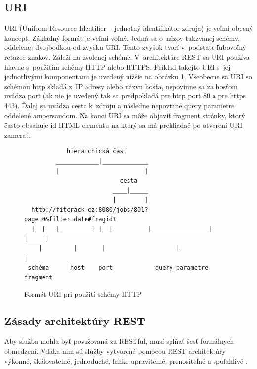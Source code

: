 \documentclass[slovak]{fitthesis}
\begin{document}
\subsection{URI} \label{URI}
URI (Uniform Resource Identifier – jednotný identifikátor zdroja) je veľmi obecný koncept. Základný formát je veľmi voľný. Jedná sa o~názov takzvanej schémy, oddelenej dvojbodkou od zvyšku URI. Tento zvyšok tvorí v~podstate ľubovoľný reťazec znakov. Záleží na zvolenej schéme\cite{URIRFC}. V~architektúre REST sa URI používa hlavne s~použitím schémy HTTP alebo HTTPS. Príklad takejto URI s~jej jednotlivými komponentami je uvedený nižšie na obrázku \ref{fig:formatURI}. Všeobecne sa URI so schémou http skladá z~IP adresy alebo názvu hosťa, nepovinne sa za hosťom uvádza port (ak nie je uvedený tak sa predpokladá pre http port 80 a pre https 443). Ďalej sa uvádza cesta k~zdroju a následne nepovinné query parametre oddelené ampersandom. Na konci URI sa môže objaviť fragment stránky, ktorý často obsahuje id HTML elementu na ktorý sa má prehliadač po otvorení URI zamerať.



\begin{figure}[H]
\begin{center}
\begin{varwidth}{\linewidth}
\begin{verbatim}
            hierarchická časť
         ____________|_____________                  
         |                        |
                           cesta
                         ____|_____
                         |        |
  http://fitcrack.cz:8080/jobs/801?page=0&filter=date#fragid1
  |__|   |_________| |__|          |________________| |_____|
    |         |       |                    |               |
 schéma      host    port            query parametre    fragment

\end{verbatim}
\end{varwidth}
\end{center}
\caption{Formát URI pri použití schémy HTTP}
\label{fig:formatURI}
\end{figure}



\subsection{Zásady architektúry REST} \label{zasadyREST}
Aby služba mohla byť považovaná za RESTful, musí spĺňať šesť formálnych obmedzení. Vďaka nim sú služby vytvorené pomocou REST architektúry výkonné, škálovateľné, jednoduché, ľahko upraviteľné, prenositeľné a spoľahlivé \cite{masse2011rest}.
\end{document}
